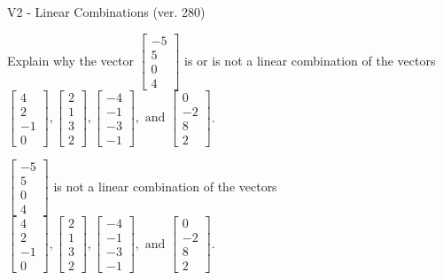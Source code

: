 \begin{exercise}
  \begin{exerciseTitle}V2 - Linear Combinations (ver. 280)\end{exerciseTitle}
  \begin{exerciseStatement}
    Explain why the vector \(\left[\begin{array}{c}
-5 \\
5 \\
0 \\
4
\end{array}\right]\)  is or is not a linear 
	combination of the vectors \(\left[\begin{array}{c}
4 \\
2 \\
-1 \\
0
\end{array}\right] , \left[\begin{array}{c}
2 \\
1 \\
3 \\
2
\end{array}\right] , \left[\begin{array}{c}
-4 \\
-1 \\
-3 \\
-1
\end{array}\right] , \text{ and } \left[\begin{array}{c}
0 \\
-2 \\
8 \\
2
\end{array}\right]\).
	


  \end{exerciseStatement}
  \begin{exerciseAnswer}
   \(\left[\begin{array}{c}
-5 \\
5 \\
0 \\
4
\end{array}\right]\) 
  	 is not  
	a linear combination of the vectors \(\left[\begin{array}{c}
4 \\
2 \\
-1 \\
0
\end{array}\right] , \left[\begin{array}{c}
2 \\
1 \\
3 \\
2
\end{array}\right] , \left[\begin{array}{c}
-4 \\
-1 \\
-3 \\
-1
\end{array}\right] , \text{ and } \left[\begin{array}{c}
0 \\
-2 \\
8 \\
2
\end{array}\right]\).


\end{exerciseAnswer}
\end{exercise}
